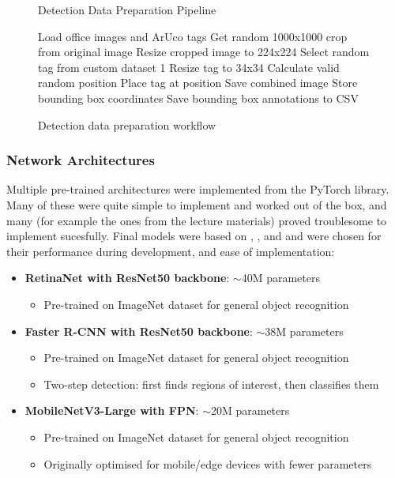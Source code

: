 \documentclass[conference]{IEEEtran}
\begin{document}
\begin{figure}[H]
\begin{algorithm}[H]
\caption{Detection Data Preparation Pipeline}
\begin{algorithmic}[1]
\STATE Load office images and ArUco tags
    \STATE Get random 1000x1000 crop from original image
    \STATE Resize cropped image to 224x224
        \STATE Select random tag from custom dataset 1
        \STATE Resize tag to 34x34
        \STATE Calculate valid random position
        \STATE Place tag at position
        \STATE Save combined image
        \STATE Store bounding box coordinates
    \ENDFOR
\ENDFOR
\STATE Save bounding box annotations to CSV
\end{algorithmic}
\end{algorithm}
\caption{Detection data preparation workflow}
\end{figure}

\subsubsection{Network Architectures}

Multiple pre-trained architectures were implemented from the PyTorch library. Many of these were quite simple to implement and
worked out of the box, and many (for example the ones from the lecture materials) proved troublesome to implement sucesfully.
Final models were based on \textcite{pytorch_retinanet}, \textcite{pytorch_fasterrcnn}, and \textcite{pytorch_mobilenet_rcnn} and were
chosen for their performance during development, and ease of implementation:

\begin{itemize}
    \item \textbf{RetinaNet with ResNet50 backbone}: $\sim$40M parameters
    \begin{itemize}
        \item Pre-trained on ImageNet dataset for general object recognition
    \end{itemize}
    
    \item \textbf{Faster R-CNN with ResNet50 backbone}: $\sim$38M parameters
    \begin{itemize}
        \item Pre-trained on ImageNet dataset for general object recognition
        \item Two-step detection: first finds regions of interest, then classifies them
    \end{itemize}
    
    \item \textbf{MobileNetV3-Large with FPN}: $\sim$20M parameters
    \begin{itemize}
        \item Pre-trained on ImageNet dataset for general object recognition
        \item Originally optimised for mobile/edge devices with fewer parameters
    \end{itemize}
\end{itemize}
\end{document}
